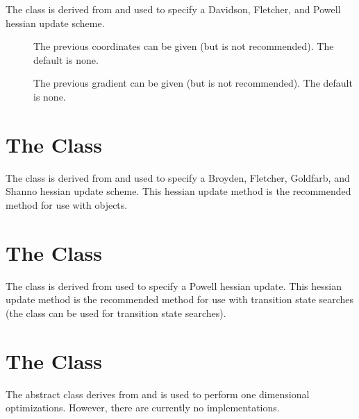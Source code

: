 The  class is derived from  and
used to specify a Davidson, Fletcher, and Powell hessian update scheme.

\begin{description}
  \item[] The previous coordinates can be given (but is not
    recommended).  The default is none.

  \item[] The previous gradient can be given (but is not
    recommended).  The default is none.

\end{description}


\section{The  Class}\label{BFGSUpdate}

The  class is derived from  and used
to specify a Broyden, Fletcher, Goldfarb, and Shanno hessian update scheme.
This hessian update method is the recommended method for use with
 objects.


\section{The  Class}\label{PowellUpdate}

The  class is derived from 
used to specify a Powell hessian update.  This hessian update method is the
recommended method for use with transition state searches (the
 class can be used for transition state searches).


\section{The  Class}\label{LineOpt}

The  abstract class derives from  and is
used to perform one dimensional optimizations.  However, there are
currently no implementations.

